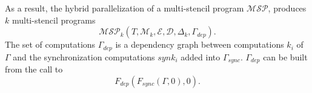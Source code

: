 As a result, the hybrid parallelization of a multi-stencil program $\mathcal{MSP}$, produces $k$ multi-stencil programs
\begin{equation*}
\mathcal{MSP}_k(T,\mathcal{M}_k,\mathcal{E},\mathcal{D},\Delta_k,\Gamma_{dep}).
\end{equation*}
The set of computations $\Gamma_{dep}$ is a dependency graph between computations $k_i$ of $\Gamma$ and the synchronization computations $synk_i$ added into $\Gamma_{sync}$. $\Gamma_{dep}$ can be built from the call to 
\begin{equation*}
F_{dep}(F_{sync}(\Gamma,0),0).
\end{equation*}


 

